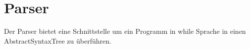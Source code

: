 \section{Parser}

Der Parser bietet eine Schnittstelle um ein Programm in while Sprache in einen AbstractSyntaxTree zu überführen.
